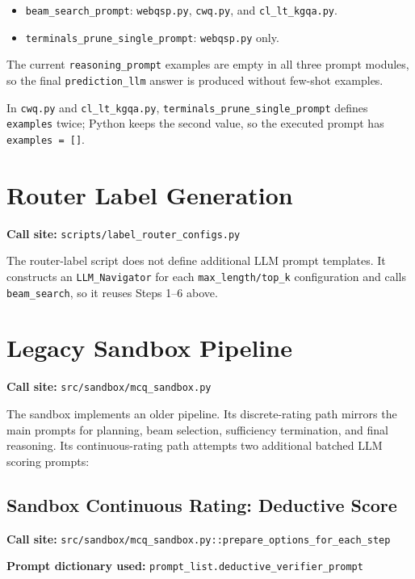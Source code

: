 \documentclass[11pt]{article}
\begin{document}
\begin{itemize}
  \item \texttt{beam\_search\_prompt}: \texttt{webqsp.py}, \texttt{cwq.py}, and \texttt{cl\_lt\_kgqa.py}.
  \item \texttt{terminals\_prune\_single\_prompt}: \texttt{webqsp.py} only.
\end{itemize}

The current \texttt{reasoning\_prompt} examples are empty in all three prompt
modules, so the final \texttt{prediction\_llm} answer is produced without
few-shot examples.

In \texttt{cwq.py} and \texttt{cl\_lt\_kgqa.py},
\texttt{terminals\_prune\_single\_prompt} defines \texttt{examples} twice; Python
keeps the second value, so the executed prompt has \texttt{examples = []}.

\section{Router Label Generation}

\textbf{Call site:} \texttt{scripts/label\_router\_configs.py}

The router-label script does not define additional LLM prompt templates. It
constructs an \texttt{LLM\_Navigator} for each \texttt{max\_length/top\_k}
configuration and calls \texttt{beam\_search}, so it reuses Steps 1--6 above.

\section{Legacy Sandbox Pipeline}

\textbf{Call site:} \texttt{src/sandbox/mcq\_sandbox.py}

The sandbox implements an older pipeline. Its discrete-rating path mirrors the
main prompts for planning, beam selection, sufficiency termination, and final
reasoning. Its continuous-rating path attempts two additional batched LLM
scoring prompts:

\subsection{Sandbox Continuous Rating: Deductive Score}

\textbf{Call site:} \texttt{src/sandbox/mcq\_sandbox.py::prepare\_options\_for\_each\_step}

\textbf{Prompt dictionary used:} \texttt{prompt\_list.deductive\_verifier\_prompt}
\end{document}
